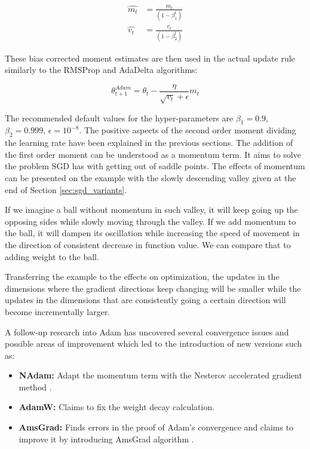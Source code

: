 \documentclass[12pt, titlepage]{article}
\begin{document}
\begin{equation}\label{eq:adam_moments}
\begin{aligned}
\hat{m_t} &= \frac{m_t}{(1 - \beta_1^t)}\\
\hat{v_t} &= \frac{v_t}{(1 - \beta_2^t)}
\end{aligned}
\end{equation}


These bias corrected moment estimates are then used in the actual update rule similarly to the RMSProp and AdaDelta algorithms:

\begin{equation}\label{eq:adam_update}
\theta_{t+1}^{Adam} = \theta_{t} - \frac{\eta}{\sqrt{v_t} + \epsilon} m_t
\end{equation}

The recommended default values for the hyper-parameters are $\beta_1 = 0.9$, $\beta_2 = 0.999$, $\epsilon = 10^{-8}$.
The positive aspects of the second order moment dividing the learning rate have been explained in the previous sections. The addition of the first order moment can be understood as a momentum term. It aims to solve the problem SGD has with getting out of saddle points. 
The effects of momentum can be presented on the example with the slowly descending valley given at the end of Section \ref{sec:sgd_variants}. 

If we imagine a ball without momentum in such valley, it will keep going up the opposing sides while slowly moving through the valley. If we add momentum to the ball, it will dampen its oscillation while increasing the speed of movement in the direction of consistent decrease in function value. We can compare that to adding weight to the ball. 

Transferring the example to the effects on optimization, the updates in the dimensions where the gradient directions keep changing will be smaller while the updates in the dimensions that are consistently going a certain direction will become incrementally larger.

A follow-up research into Adam has uncovered several convergence issues and possible areas of improvement which led to the introduction of new versions such as:

\begin{itemize} 
\item \textbf{NAdam:} Adapt the momentum term with the Nesterov accelerated gradient method \cite{dozat2016incorporating}.
\item \textbf{AdamW:} Claims to fix the weight decay calculation\cite{loshchilov2017fixing}.
\item \textbf{AmsGrad:} Finds errors in the proof of Adam's convergence and claims to improve it by introducing AmsGrad algorithm \cite{reddi2018convergence}.
\end{itemize}
\end{document}
